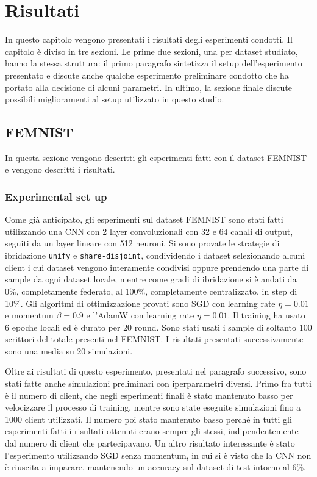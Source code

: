 \chapter{Risultati}
In questo capitolo vengono presentati i risultati degli esperimenti 
condotti. Il capitolo è diviso in tre sezioni.
Le prime due sezioni, una per dataset studiato, hanno la stessa 
struttura: il primo paragrafo sintetizza il 
setup dell'esperimento presentato e discute anche qualche esperimento
preliminare condotto che ha portato alla decisione di alcuni parametri.
In ultimo, la sezione finale discute possibili miglioramenti al setup
utilizzato in questo studio.


\section{FEMNIST}
In questa sezione vengono descritti gli esperimenti fatti con il dataset
FEMNIST e vengono descritti i risultati.

\subsection{Experimental set up}
Come già anticipato, gli esperimenti sul dataset FEMNIST sono stati fatti 
utilizzando una CNN con 2 layer convoluzionali con 32 e 64 canali di 
output, seguiti da un layer lineare con 512 neuroni. Si sono provate le 
strategie di ibridazione \texttt{unify} e \texttt{share-disjoint},
condividendo i dataset selezionando alcuni client i cui dataset 
vengono interamente condivisi oppure prendendo una parte di sample da 
ogni dataset locale, mentre come gradi di ibridazione si è andati da 0\%,
completamente federato, al 100\%, completamente centralizzato,
in step di 10\%. Gli algoritmi di ottimizzazione provati sono SGD 
con learning rate \(\eta = 0.01\) e momentum \(\beta = 0.9\) e l'AdamW
con learning rate \(\eta = 0.01\). Il training ha usato 6 epoche locali
ed è durato per 20 round. Sono stati usati i sample di soltanto 100 
scrittori del totale presenti nel FEMNIST. I risultati presentati 
successivamente sono una media su 20 simulazioni.

Oltre ai risultati di questo esperimento, presentati nel paragrafo
successivo, sono stati fatte anche simulazioni preliminari con 
iperparametri diversi. Primo fra tutti è il numero di client, che negli 
esperimenti finali è stato mantenuto basso per velocizzare il processo 
di training, mentre sono state eseguite simulazioni fino a 1000 client 
utilizzati. Il numero poi stato mantenuto basso perché in tutti gli 
esperimenti fatti i risultati ottenuti erano sempre gli stessi, 
indipendentemente dal numero di client che partecipavano.
Un altro risultato interessante è stato l'esperimento utilizzando SGD
senza momentum, in cui si è visto che la CNN non è riuscita a imparare,
mantenendo un accuracy sul dataset di test intorno al 6\%.

